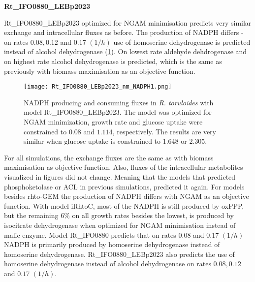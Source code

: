 \textbf{Rt\_IFO0880\_LEBp2023}

Rt\_IFO0880\_LEBp2023 optimized for NGAM minimisation predicts 
very similar exchange and intracellular fluxes as before. 
The production of NADPH differs - on rates $0.08, 0.12$ and $0.17$ $(1/h)$ use of homoserine dehydrogenase is predicted instead of alcohol dehydrogenase (\ref{fig:Rt_IFO0880_LEBp2023_nm_NADPH1}). 
On lowest rate aldehyde dehdrogenase and on highest rate alcohol dehydrogenase is predicted, which is the same as previously with biomass 
maximisation as an objective function.  
\begin{figure}[H]
    \centering
    \texttt{[image: Rt\_IFO0880\_LEBp2023\_nm\_NADPH1.png]}
    \caption{NADPH producing and consuming fluxes in \textit{R. toruloides} with model Rt\_IFO0880\_LEBp2023. The model was optimized for NGAM minimization, 
    growth rate and glucose uptake were constrained to $0.0$8 and $1.114$, respectively. The results are very similar when glucose uptake is constrained to $1.648$ or $2.305$.}
    \label{fig:Rt_IFO0880_LEBp2023_nm_NADPH1}
\end{figure}

For all simulations, the exchange fluxes are the same as with biomass maximisation as objective function. Also, fluxes of the intracellular
metabolites visualized in figures did not change. Meaning that the models that predicted phosphoketolase or ACL in previous simulations, 
predicted it again. For models besides rhto-GEM the production of NADPH differs with NGAM as an objective function.
With model iRhtoC, most of the NADPH is still produced by oxPPP, but the remaining $6\%$ on all growth rates besides the lowest, 
is produced by isocitrate dehydrogenase when optimized for NGAM minimisation instead of malic enzyme. Model Rt\_IFO0880  
predicts that on rates $0.08$ and $0.17$ $(1/h)$ NADPH is primarily produced by homoserine dehydrogenase instead of homoserine dehydrogenase.
Rt\_IFO0880\_LEBp2023 also predicts the use of homoserine dehydrogenase instead of alcohol dehydrogenase on rates $0.08, 0.12$ and $0.17$ $(1/h)$.









